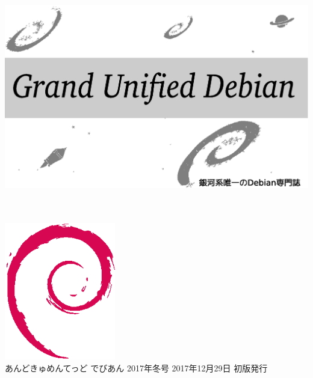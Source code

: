 \documentclass[mingoth,a4paper]{jsarticle}
\begin{document}
\begin{titlepage}
\thispagestyle{empty}

\hspace*{-2.5cm}
\includegraphics{image2012-natsu/gudeb.eps}\\
\\
\\

\hspace*{11cm}\includegraphics[height=6cm]{image200502/openlogo-nd.eps}\\
\vspace*{0.1cm}
\hfill あんどきゅめんてっど でびあん 2017年冬号 2017年12月29日 初版発行
\end{titlepage}

\newpage
\thispagestyle{empty}\mbox{}
\newpage
\end{document}
